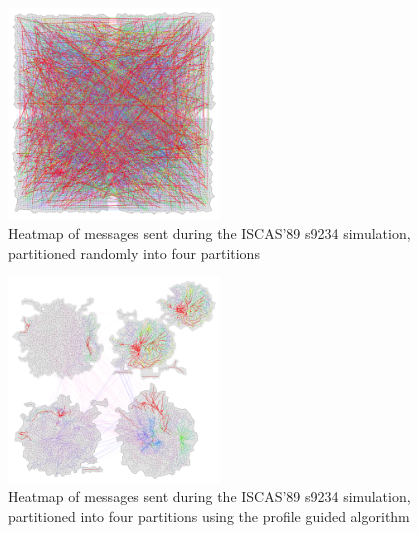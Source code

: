 \documentclass{wscpaperproc}
\begin{document}
\begin{figure}[h]
\centering
\includegraphics[clip=true,width=0.5\textwidth]{s9234_4rr}
\caption{Heatmap of messages sent during the ISCAS'89 s9234 simulation, partitioned randomly into four partitions}
\label{fig:iscas4rr}
\end{figure}

\begin{figure}[h]
\centering
\includegraphics[clip=true,width=0.5\textwidth]{s9234_4part}
\caption{Heatmap of messages sent during the ISCAS'89 s9234 simulation, partitioned into four partitions using the profile guided algorithm}
\label{fig:iscas4part}
\end{figure}
\end{document}
